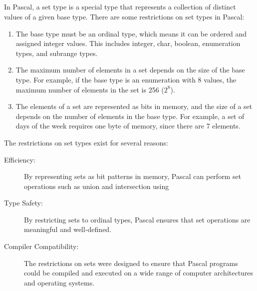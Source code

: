 \documentclass{article}
\begin{document}
\subsection{}
In Pascal, a set type is a special type that represents a collection of distinct values of a given base type. There are some restrictions on set types
in Pascal:
\begin{enumerate}
    \item The base type must be an ordinal type, which means it can be ordered and assigned integer values. This includes integer, char, boolean,
        enumeration types, and subrange types.
    \item The maximum number of elements in a set depends on the size of the base type. For example, if the base type is an enumeration with 8
        values, the maximum number of elements in the set is 256 ($2^8$).
    \item The elements of a set are represented as bits in memory, and the size of a set depends on the number of elements in the base type. For
        example, a set of days of the week requires one byte of memory, since there are 7 elements.
\end{enumerate}
The restrictions on set types exist for several reasons:
\begin{description}
    \item[Efficiency:] By representing sets as bit patterns in memory, Pascal can perform set operations such as union and intersection using
    \item[Type Safety:] By restricting sets to ordinal types, Pascal ensures that set operations are meaningful and well-defined.
    \item[Compiler Compatibility:] The restrictions on sets were designed to ensure that Pascal programs could be compiled and executed on a
        wide range of computer architectures and operating systems.
\end{description}
\end{document}
